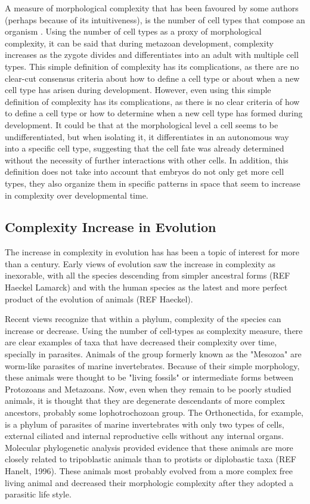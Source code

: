 A measure of morphological complexity that has been favoured by some authors (perhaps because of its intuitiveness), is the number of cell types that compose an organism 
	\citep{Bell1997,Bonner2004,McShea1996}.
Using the number of cell types as a proxy of morphological complexity, it can be said that during metazoan development, complexity increases as the zygote divides and differentiates into an adult with multiple cell types. This simple definition of complexity has its complications, as there are no clear-cut consensus criteria about how to define a cell type or about when a new cell type has arisen during development. 
However, even using this simple definition of complexity has its complications, as there is no clear criteria of how to define a cell type or how to determine when a new cell type has formed during development. It could be that at the morphological level a cell seems to be undifferentiated, but when isolating it, it differentiates in an autonomous way into a specific cell type, suggesting that the cell fate was already determined without the necessity of further interactions with other cells. 
In addition, this definition does not take into account that embryos do not only get more cell types, they also organize them in specific patterns in space that seem to increase in complexity over developmental time.

\subsection{Complexity Increase in Evolution}

The increase in complexity in evolution has has been a topic of interest for more than a century.
Early views of evolution saw the increase in complexity as inexorable, with all the species descending from simpler ancestral forms (REF Haeckel Lamarck) and with the human species as the latest and more perfect product of the evolution of animals (REF Haeckel).


Recent views recognize that within a phylum, complexity of the species can increase or decrease.
Using the number of cell-types as complexity measure, there are clear examples of taxa that have decreased their complexity over time, specially in parasites.
Animals of the group formerly known as the "Mesozoa" are worm-like parasites of marine invertebrates.
Because of their simple morphology, these animals were thought to be "living fossils" or intermediate forms between Protozoans and Metazoans.
Now, even when they remain to be poorly studied animals, it is thought that they are  degenerate descendants of more complex ancestors, probably some lophotrochozoan group\citep{Arthur2010}.
The Orthonectida, for example, is a phylum of parasites of marine invertebrates with only two types of cells, external ciliated and internal reproductive cells without any internal organs. 
Molecular phylogenetic analysis provided evidence that these animals are more closely related to tripoblastic animals than to protists or diplobastic taxa (REF Hanelt, 1996).
These animals most probably evolved from a more complex free living animal and decreased their morphologic complexity after they adopted a parasitic life style.

